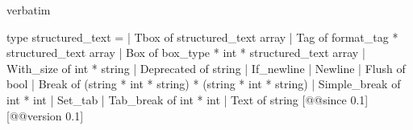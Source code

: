 \begin{camlexample}{verbatim}
\begin{caml}
\begin{camlinput}
type structured_text =
  | Tbox of structured_text array
  | Tag of format_tag * structured_text array
  | Box of box_type * int * structured_text array
  | With_size of int * string
  | Deprecated of string
  | If_newline
  | Newline
  | Flush of bool
  | Break of (string * int * string) * (string * int * string)
  | Simple_break of int * int
  | Set_tab
  | Tab_break of int * int
  | Text of string
[@@since 0.1] [@@version 0.1]
\end{camlinput}
\end{caml}
\end{camlexample}
